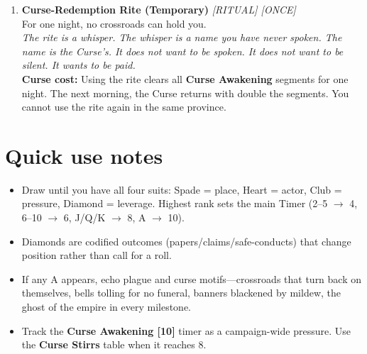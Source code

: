 \begin{enumerate}
\item \textbf{Curse-Redemption Rite (Temporary)} \hfill {} \textit{[RITUAL] [ONCE]} \\
  For one night, no crossroads can hold you. \\
  \textit{The rite is a whisper. The whisper is a name you have never spoken. The name is the Curse's. It does not want to be spoken. It does not want to be silent. It wants to be paid.} \\
  \textbf{Curse cost:} Using the rite clears all \textbf{Curse Awakening} segments for one night. The next morning, the Curse returns with double the segments. You cannot use the rite again in the same province.
\end{enumerate}

\section*{Quick use notes}
\label{sec:acasia-quick-use}
\begin{itemize}
\item Draw until you have all four suits: Spade = place, Heart = actor, Club = pressure, Diamond = leverage. Highest rank sets the main Timer (2--5 $\rightarrow$ 4, 6--10 $\rightarrow$ 6, J/Q/K $\rightarrow$ 8, A $\rightarrow$ 10).
\item Diamonds are codified outcomes (papers/claims/safe-conducts) that change position rather than call for a roll.
\item If any A appears, echo plague and curse motifs---crossroads that turn back on themselves, bells tolling for no funeral, banners blackened by mildew, the ghost of the empire in every milestone.
\item Track the \textbf{Curse Awakening [10]} timer as a campaign-wide pressure. Use the \textbf{Curse Stirrs} table when it reaches 8.
\end{itemize}

